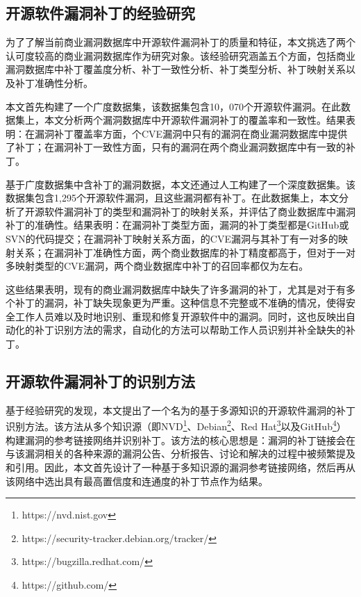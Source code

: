 \subsection{开源软件漏洞补丁的经验研究}
为了了解当前商业漏洞数据库中开源软件漏洞补丁的质量和特征，本文挑选了两个认可度较高的商业漏洞数据库作为研究对象。该经验研究涵盖五个方面，包括商业漏洞数据库中补丁覆盖度分析、补丁一致性分析、补丁类型分析、补丁映射关系以及补丁准确性分析。

本文首先构建了一个广度数据集，该数据集包含10，070个开源软件漏洞。在此数据集上，本文分析两个漏洞数据库中开源软件漏洞补丁的覆盖率和一致性。结果表明：在漏洞补丁覆盖率方面，个CVE漏洞中只有的漏洞在商业漏洞数据库中提供了补丁；在漏洞补丁一致性方面，只有的漏洞在两个商业漏洞数据库中有一致的补丁。%

基于广度数据集中含补丁的漏洞数据，本文还通过人工构建了一个深度数据集。该数据集包含1,295个开源软件漏洞，且这些漏洞都有补丁。在此数据集上，本文分析了开源软件漏洞补丁的类型和漏洞补丁的映射关系，并评估了商业数据库中漏洞补丁的准确性。结果表明：在漏洞补丁类型方面，漏洞的补丁类型都是GitHub或SVN的代码提交；在漏洞补丁映射关系方面，的CVE漏洞与其补丁有一对多的映射关系；在漏洞补丁准确性方面，两个商业数据库的补丁精度都高于，但对于一对多映射类型的CVE漏洞，两个商业数据库中补丁的召回率都仅为左右。

这些结果表明，现有的商业漏洞数据库中缺失了许多漏洞的补丁，尤其是对于有多个补丁的漏洞，补丁缺失现象更为严重。这种信息不完整或不准确的情况，使得安全工作人员难以及时地识别、重现和修复开源软件中的漏洞。同时，这也反映出自动化的补丁识别方法的需求，自动化的方法可以帮助工作人员识别并补全缺失的补丁。

\subsection{开源软件漏洞补丁的识别方法}
基于经验研究的发现，本文提出了一个名为\tool 的基于多源知识的开源软件漏洞的补丁识别方法。该方法从多个知识源（即NVD\footnote{https://nvd.nist.gov}、Debian\footnote{https://security-tracker.debian.org/tracker/}、Red Hat\footnote{https://bugzilla.redhat.com/}以及GitHub\footnote{https://github.com/}）构建漏洞的参考链接网络并识别补丁。该方法的核心思想是：漏洞的补丁链接会在与该漏洞相关的各种来源的漏洞公告、分析报告、讨论和解决的过程中被频繁提及和引用。因此，本文首先设计了一种基于多知识源的漏洞参考链接网络，然后再从该网络中选出具有最高置信度和连通度的补丁节点作为结果。

